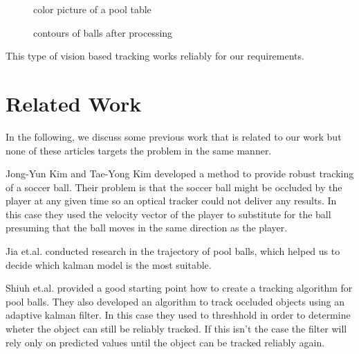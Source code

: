 \documentclass[notitlepage, a4paper, 11pt]{scrartcl}
\begin{document}
\begin{multicols}{2}
\begin{figure}[H]
    \centering
    \caption{color picture of a pool table}
    \label{pic:pool-color}
\end{figure}

\begin{figure}[H]
    \centering
    \caption{contours of balls after processing}
    \label{pic:pool-bw}
\end{figure}

This type of vision based tracking works reliably for our requirements.

\section{Related Work}

In the following, we discuss some previous work that is related to our work but none of these articles targets the problem in the same manner.

Jong-Yun Kim and Tae-Yong Kim \cite{kim} developed a method to provide robust tracking of a soccer ball. Their problem is that the soccer ball might be occluded by the player at any given time
so an optical tracker could not deliver any results. In this case they used the velocity vector of the player to substitute for the ball presuming that the ball moves in the same direction as the player.

Jia et.al. \cite{jia} conducted research in the trajectory of pool balls, which helped us to decide which kalman model is the most suitable.

Shiuh et.al. \cite{shiuh} provided a good starting point how to create a tracking algorithm for pool balls. They also developed an algorithm to track occluded objects using an adaptive kalman filter.
In this case they used to threshhold in order to determine wheter the object can still be reliably tracked. If this isn't the case the filter will rely only on predicted values until the object can be tracked reliably again.


\end{multicols}
\end{document}
